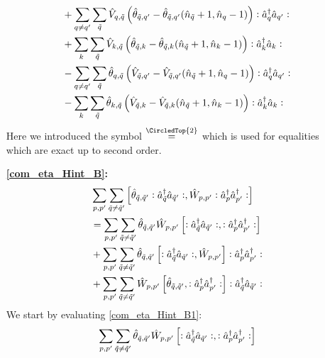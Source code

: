 \begin{appendix}
\begin{itemize}
\begin{align}
&+\sum\limits_{q\neq q^\prime}\sum\limits_{\tilde q} \hat V_{q,\tilde q}\left(\hat\theta_{\tilde q,q^\prime}-\hat\theta_{\tilde q,q^\prime}(\hat n_{\tilde q}+1,\hat n_q-1)\right)\vcentcolon\hat a^\dagger_{q}\hat a_{q^\prime}\vcentcolon\nonumber \\
&+\sum\limits_{k}\sum\limits_{\tilde q} \hat V_{k,\tilde q}\left(\hat\theta_{\tilde q,k}-\hat\theta_{\tilde q,k}(\hat n_{\tilde q}+1,\hat n_k-1)\right)\vcentcolon\hat a^\dagger_{k}\hat a_{k}\vcentcolon\nonumber \\
&-\sum\limits_{q\neq q^\prime}\sum\limits_{\tilde q} \hat \theta_{q,\tilde q}\left(\hat V_{\tilde q,q^\prime}-\hat V_{\tilde q,q^\prime}(\hat n_{\tilde q}+1,\hat n_q-1)\right)\vcentcolon\hat a^\dagger_{q}\hat a_{q^\prime}\vcentcolon\nonumber \\
&-\sum\limits_{k}\sum\limits_{\tilde q} \hat \theta_{k,\tilde q}\left(\hat V_{\tilde q,k}-\hat V_{\tilde q,k}(\hat n_{\tilde q}+1,\hat n_k-1)\right)\vcentcolon\hat a^\dagger_{k}\hat a_{k}\vcentcolon\nonumber
\end{align}
Here we introduced the symbol $\overset{\CircledTop{2}}{=}$ which is used for equalities which are exact up to second order.
\item[\textbf{\ref{com_eta_Hint_B}:}]
\begin{subequations}
\begin{align}
&\sum\limits_{p, p^\prime}\sum\limits_{\tilde q\neq\tilde q^\prime} \left[\hat\theta_{\tilde q,\tilde q^\prime}\vcentcolon\hat a^\dagger_{\tilde q}\hat a_{\tilde q^\prime}\vcentcolon,\hat W_{p,p^\prime}\vcentcolon\hat a^\dagger_p\hat a^\dagger_{p^\prime}\vcentcolon\right]\nonumber \\
&=\sum\limits_{p, p^\prime}\sum\limits_{\tilde q\neq\tilde q^\prime} \hat\theta_{\tilde q,\tilde q^\prime}\hat W_{p,p^\prime}\left[\vcentcolon\hat a^\dagger_{\tilde q}\hat a_{\tilde q^\prime}\vcentcolon,\vcentcolon\hat a^\dagger_p\hat a^\dagger_{p^\prime}\vcentcolon\right]\label{com_eta_Hint_B1}\\
&+\sum\limits_{p, p^\prime}\sum\limits_{\tilde q\neq\tilde q^\prime} \hat\theta_{\tilde q,\tilde q^\prime}\left[\vcentcolon\hat a^\dagger_{\tilde q}\hat a_{\tilde q^\prime}\vcentcolon,\hat W_{p,p^\prime}\right]\vcentcolon\hat a^\dagger_p\hat a^\dagger_{p^\prime}\label{com_eta_Hint_B2}\vcentcolon\\
&+\sum\limits_{p, p^\prime}\sum\limits_{\tilde q\neq\tilde q^\prime} \hat W_{p,p^\prime}\left[\hat\theta_{\tilde q,\tilde q^\prime},\vcentcolon\hat a^\dagger_p\hat a^\dagger_{p^\prime}\vcentcolon\right]\vcentcolon\hat a^\dagger_{\tilde q}\hat a_{\tilde q^\prime}\label{com_eta_Hint_B3}\vcentcolon
\end{align}
\end{subequations}
We start by evaluating \ref{com_eta_Hint_B1}:
\begin{align}
&\Sum_{p, p^\prime}\Sum_{\tilde q\neq\tilde q^\prime} \hat\theta_{\tilde q,\tilde q^\prime}\hat W_{p,p^\prime}\left[\NO\CR_{\tilde q}\AN_{\tilde q^\prime}\NO,\NO\CR_p\CR_{p^\prime}\NO\right]\nonumber \\

\end{align}
\end{itemize}
\end{appendix}
